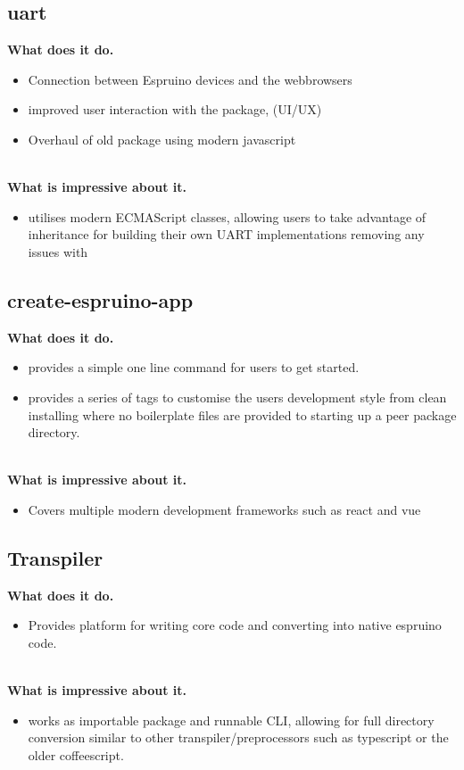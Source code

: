 \documentclass{l4proj}
\begin{document}
\subsection{uart}

\textbf{What does it do.}
\begin{itemize}
    \item Connection between Espruino devices and the webbrowsers
    \item improved user interaction with the package, (UI/UX)
    \item Overhaul of old package using modern javascript
\end{itemize}
\\
\textbf{What is impressive about it.}
\begin{itemize}
    \item utilises modern ECMAScript classes, allowing users to take advantage of inheritance for building their own UART implementations removing any issues with 
\end{itemize}

\subsection{create-espruino-app}

\textbf{What does it do.}
\begin{itemize}
    \item provides a simple one line command for users to get started. 
    \item provides a series of tags to customise the users development style from clean installing where no boilerplate files are provided to starting up a peer package directory.
\end{itemize}
\\
\textbf{What is impressive about it.}
\begin{itemize}
    \item Covers multiple modern development frameworks such as react and vue
\end{itemize}
\subsection{Transpiler}

\textbf{What does it do.}
\begin{itemize}
    \item Provides platform for writing core code and converting into native espruino code.
\end{itemize}
\\
\textbf{What is impressive about it.}
\begin{itemize}
    \item works as importable package and runnable CLI, allowing for full directory conversion similar to other transpiler/preprocessors such as typescript or the older coffeescript.
\end{itemize}
\end{document}
